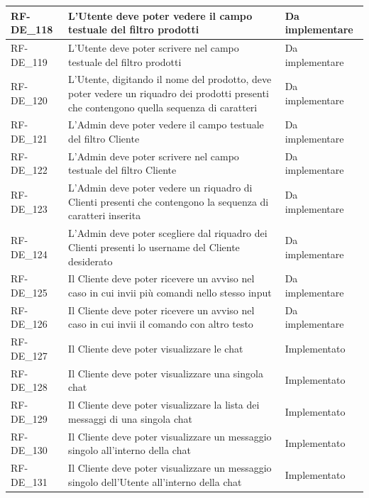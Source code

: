 \begin{longtable}{|>{\raggedright}p{}|>{\raggedright\arraybackslash}p{}|>{\raggedright\arraybackslash}p{}|}
	\hline
	RF-DE\_118 \hypertarget{rf-de_118} & L'Utente deve poter vedere il campo testuale del filtro prodotti & Da implementare \\
	\hline
	RF-DE\_119 \hypertarget{rf-de_119} & L'Utente deve poter scrivere nel campo testuale del filtro prodotti & Da implementare \\
	\hline
	RF-DE\_120 \hypertarget{rf-de_120} & L'Utente, digitando il nome del prodotto, deve poter vedere un riquadro dei prodotti presenti che contengono quella sequenza di caratteri & Da implementare \\
	\hline
	RF-DE\_121 \hypertarget{rf-de_121} & L'Admin deve poter vedere il campo testuale del filtro Cliente & Da implementare \\
	\hline
	RF-DE\_122 \hypertarget{rf-de_122} & L'Admin deve poter scrivere nel campo testuale del filtro Cliente & Da implementare \\
	\hline
	RF-DE\_123 \hypertarget{rf-de_123} & L'Admin deve poter vedere un riquadro di Clienti presenti che contengono la sequenza di caratteri inserita & Da implementare \\
	\hline
	RF-DE\_124 \hypertarget{rf-de_124} & L'Admin deve poter scegliere dal riquadro dei Clienti presenti lo username del Cliente desiderato & Da implementare \\
	\hline
	RF-DE\_125 \hypertarget{rf-de_125} & Il Cliente deve poter ricevere un avviso nel caso in cui invii più comandi nello stesso input & Da implementare \\
	\hline
	RF-DE\_126 \hypertarget{rf-de_126} & Il Cliente deve poter ricevere un avviso nel caso in cui invii il comando con altro testo & Da implementare \\
	\hline
	RF-DE\_127 \hypertarget{rf-de_127} & Il Cliente deve poter visualizzare le chat & Implementato \\
	\hline
	RF-DE\_128 \hypertarget{rf-de_128} & Il Cliente deve poter visualizzare una singola chat & Implementato \\
	\hline
	RF-DE\_129 \hypertarget{rf-de_129} & Il Cliente deve poter visualizzare la lista dei messaggi di una singola chat & Implementato \\
	\hline
	RF-DE\_130 \hypertarget{rf-de_130} & Il Cliente deve poter visualizzare un messaggio singolo all'interno della chat & Implementato \\
	\hline
	RF-DE\_131 \hypertarget{rf-de_131} & Il Cliente deve poter visualizzare un messaggio singolo dell'Utente all'interno della chat & Implementato \\

\end{longtable}
